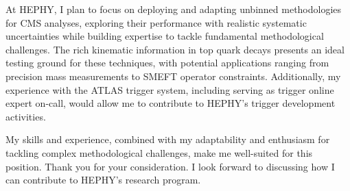 \documentclass[11pt, a4paper]{awesome-cv}
\begin{document}
\begin{cvletter}
  At HEPHY, I plan to focus on deploying and adapting unbinned methodologies for CMS analyses, exploring their performance with realistic systematic uncertainties while building expertise to tackle fundamental methodological challenges. The rich kinematic information in top quark decays presents an ideal testing ground for these techniques, with potential applications ranging from precision mass measurements to SMEFT operator constraints. Additionally, my experience with the ATLAS trigger system, including serving as trigger online expert on-call, would allow me to contribute to HEPHY's trigger development activities.

  My skills and experience, combined with my adaptability and enthusiasm for tackling complex methodological challenges, make me well-suited for this position. Thank you for your consideration. I look forward to discussing how I can contribute to HEPHY's research program.

\end{cvletter}


\makeletterclosing
\end{document}
